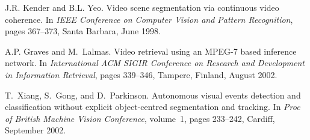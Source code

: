 
\begin{thebibliography}{10}

J.R. Kender and B.L. Yeo.
\newblock Video scene segmentation via continuous video coherence.
\newblock In {\em {IEEE} Conference on Computer Vision and Pattern
  Recognition}, pages 367--373, Santa Barbara, June 1998.

A.P. Graves and M.~Lalmas.
\newblock Video retrieval using an {MPEG-7} based inference network.
\newblock In {\em International {ACM SIGIR} Conference on Research and
  Development in Information Retrieval}, pages 339--346, Tampere, Finland,
  August 2002.

T.~Xiang, S.~Gong, and D.~Parkinson.
\newblock Autonomous visual events detection and classification without
  explicit object-centred segmentation and tracking.
\newblock In {\em Proc of British Machine Vision Conference}, volume~1,
  pages 233--242, Cardiff, September 2002.

\end{thebibliography}
